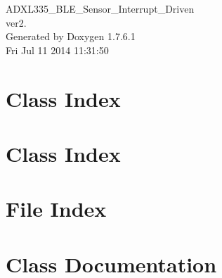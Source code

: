 \documentclass[a4paper]{book}
\begin{document}
\hypersetup{pageanchor=false,citecolor=blue}
\begin{titlepage}
\vspace*{7cm}
\begin{center}
{\Large \-A\-D\-X\-L335\-\_\-\-B\-L\-E\-\_\-\-Sensor\-\_\-\-Interrupt\-\_\-\-Driven \\[1ex]\large ver2. }\\
\vspace*{1cm}
{\large \-Generated by Doxygen 1.7.6.1}\\
\vspace*{0.5cm}
{\small Fri Jul 11 2014 11:31:50}\\
\end{center}
\end{titlepage}
\clearemptydoublepage
{}
\tableofcontents
\clearemptydoublepage
{}
\hypersetup{pageanchor=true,citecolor=blue}
\chapter{\-Class \-Index}

\chapter{\-Class \-Index}

\chapter{\-File \-Index}

\chapter{\-Class \-Documentation}


























\end{document}
